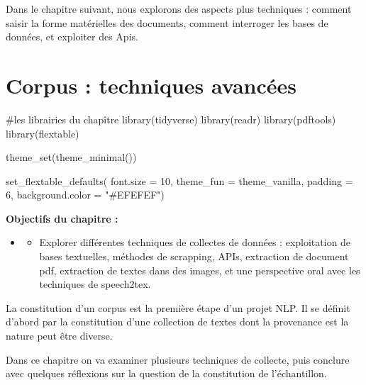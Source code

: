 \documentclass[
  letterpaper,
  DIV=11,
  numbers=noendperiod]{scrreprt}
\newenvironment{Shaded}{\begin{snugshade}}{\end{snugshade}}
\newcommand{\AttributeTok}[1]{\textcolor[rgb]{0.40,0.45,0.13}{#1}}
\newcommand{\CommentTok}[1]{\textcolor[rgb]{0.37,0.37,0.37}{#1}}
\newcommand{\DecValTok}[1]{\textcolor[rgb]{0.68,0.00,0.00}{#1}}
\newcommand{\FunctionTok}[1]{\textcolor[rgb]{0.28,0.35,0.67}{#1}}
\newcommand{\NormalTok}[1]{\textcolor[rgb]{0.00,0.23,0.31}{#1}}
\newcommand{\StringTok}[1]{\textcolor[rgb]{0.13,0.47,0.30}{#1}}
\providecommand{\tightlist}{%
  \setlength{\itemsep}{0pt}\setlength{\parskip}{0pt}}\usepackage{longtable,booktabs,array}
\begin{document}
Dans le chapitre suivant, nous explorons des aspects plus techniques :
comment saisir la forme matérielles des documents, comment interroger
les bases de données, et exploiter des Apis.


\chapter{Corpus : techniques
avancées}\label{corpus-techniques-avancuxe9es}

\begin{Shaded}
\begin{Highlighting}[]
\CommentTok{\#les librairies du chapître}
\FunctionTok{library}\NormalTok{(tidyverse)}
\FunctionTok{library}\NormalTok{(readr)}
\FunctionTok{library}\NormalTok{(pdftools)}
\FunctionTok{library}\NormalTok{(flextable)}


\FunctionTok{theme\_set}\NormalTok{(}\FunctionTok{theme\_minimal}\NormalTok{()) }

\FunctionTok{set\_flextable\_defaults}\NormalTok{(}
  \AttributeTok{font.size =} \DecValTok{10}\NormalTok{, }\AttributeTok{theme\_fun =}\NormalTok{ theme\_vanilla,}
  \AttributeTok{padding =} \DecValTok{6}\NormalTok{,}
  \AttributeTok{background.color =} \StringTok{"\#EFEFEF"}\NormalTok{)}
\end{Highlighting}
\end{Shaded}

\textbf{Objectifs du chapitre :}

\begin{itemize}
\tightlist
\item
  \begin{itemize}
  \tightlist
  \item
    Explorer différentes techniques de collectes de données :
    exploitation de bases textuelles, méthodes de scrapping, APIs,
    extraction de document pdf, extraction de textes dans des images, et
    une perspective oral avec les techniques de speech2tex.
  \end{itemize}
\end{itemize}

La constitution d'un corpus est la première étape d'un projet NLP. Il se
définit d'abord par la constitution d'une collection de textes dont la
provenance est la nature peut être diverse.

Dans ce chapitre on va examiner plusieurs techniques de collecte, puis
conclure avec quelques réflexions sur la question de la constitution de
l'échantillon.
\end{document}
